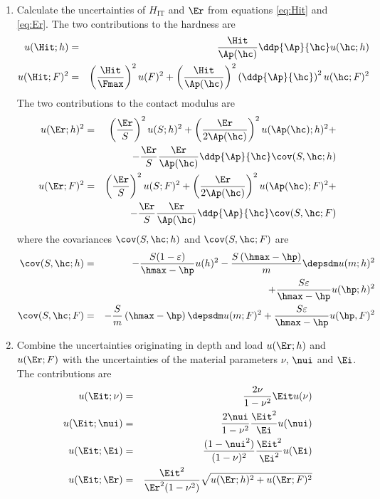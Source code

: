\begin{enumerate}
\item \label{op_unc_H_E}
 Calculate the uncertainties of $H_{\mathrm{IT}}$ and $\Er$ from equations \eqref{eq:Hit} and \eqref{eq:Er}. 
The two contributions to the hardness are
 \begin{eqnarray} 
u(\Hit;h)&=&    \frac{\Hit}{\Ap(\hc)} \ddp{ \Ap}{\hc} u(\hc;h) \\
u(\Hit;F)^2 &=& 
 \left( \frac{\Hit}{ \Fmax}\right)^2 u(F)^2 + 
 \left( \frac{\Hit}{\Ap(\hc)} \right)^2 \left(\ddp{ \Ap}{\hc}  \right)^2 u(\hc;F)^2 \nonumber \\
\end{eqnarray}
The two contributions to the contact modulus are
\begin{eqnarray}
 u(\Er;h)^2 &=& 
 \left( \frac{ \Er}{ S}\right)^2 u(S;h)^2 + 
 \left( \frac{ \Er}{ 2\Ap(\hc)} \right)^2 u(\Ap(\hc);h)^2 + \nonumber \\ 
  && -  \frac{ \Er}{ S}\frac{ \Er}{ \Ap(\hc)} \ddp{\Ap}{\hc} \cov(S,\hc;h) \\
 u(\Er;F)^2 &=& 
 \left( \frac{ \Er}{ S}\right)^2 u(S;F)^2 + 
 \left( \frac{ \Er}{ 2\Ap(\hc)} \right)^2 u(\Ap(\hc);F)^2 + \nonumber \\ 
  && -  \frac{ \Er}{ S}\frac{ \Er}{ \Ap(\hc)} \ddp{\Ap}{\hc} \cov(S,\hc;F)    
\end{eqnarray}
where the covariances $\cov(S,\hc;h)$ and $\cov(S,\hc;F)$ are
\begin{eqnarray}
  \cov(S,\hc;h) 
  &=& 
  -\frac{ S(1-\varepsilon) }{ \hmax-\hp}  u(h)^2 
  - \frac{S\left( \hmax - \hp\right)}{m}  \depsdm  u(m;h)^2  \nonumber \\
  &&+
  \frac{ S \varepsilon}{\hmax- \hp}  u(\hp;h)^2  \\
\cov(S,\hc;F) 
  &=&
   - \frac{ S }{ m} \left(\hmax -\hp\right) \depsdm  u(m;F)^2  +  \frac{ S \varepsilon }{\hmax - \hp} u(\hp,F)^2  \nonumber \\
   \end{eqnarray}
   
  \item \label{op_unc_Eit}
  Combine the uncertainties originating in depth and load $u(\Er;h)$ and $u(\Er;F)$ with the uncertainties of the material parameters $\nu$, $\nui$ and $\Ei$.
  The contributions are
  \begin{eqnarray}
   u(\Eit;\nu)  &=& \frac{2\nu}{1-\nu^2} \Eit u(\nu) \\ 
   u(\Eit;\nui) &=& \frac{2\nui}{1-\nu^2} \frac{\Eit^2}{\Ei} u(\nui) \\
   u(\Eit;\Ei) &=& \frac{(1-\nui^2)}{(1-\nu)^2} \frac{\Eit^2}{\Ei^2} u(\Ei) \\
   u(\Eit;\Er) &=& \frac{\Eit^2}{\Er^2 (1-\nu^2)} \sqrt{ u(\Er;h)^2 + u(\Er;F)^2}
  \end{eqnarray}

\end{enumerate}


